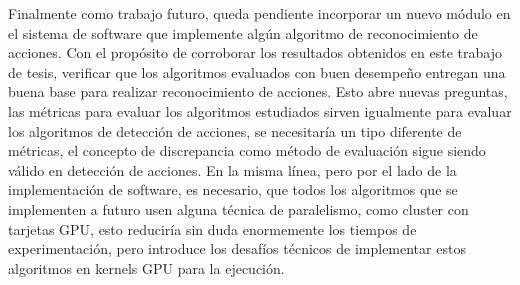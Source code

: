 Finalmente como trabajo futuro, queda pendiente incorporar un nuevo módulo en el sistema de software que implemente algún algoritmo de reconocimiento de acciones. Con el propósito de corroborar los resultados obtenidos en este trabajo de tesis, verificar que los algoritmos evaluados con buen desempeño entregan una buena base para realizar reconocimiento de acciones. Esto abre nuevas preguntas, las métricas para evaluar los algoritmos estudiados sirven igualmente para evaluar los algoritmos de detección de acciones, se necesitaría un tipo diferente de métricas, el concepto de discrepancia como método de evaluación sigue siendo válido en detección de acciones. En la misma línea, pero por el lado de la implementación de software, es necesario, que todos los algoritmos que se implementen a futuro usen alguna técnica de paralelismo, como cluster con tarjetas GPU, esto reduciría sin duda enormemente los tiempos de experimentación, pero introduce los desafíos técnicos de implementar estos algoritmos en kernels GPU para la ejecución.


